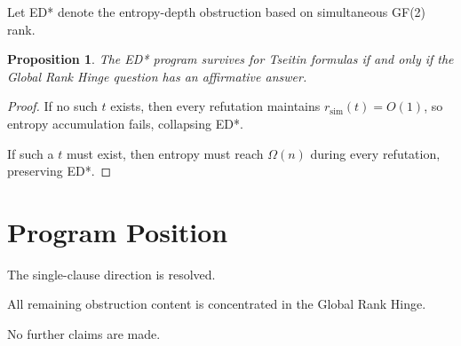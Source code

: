 \documentclass[11pt]{article}
\newtheorem{proposition}{Proposition}
\begin{document}
Let ED* denote the entropy-depth obstruction
based on simultaneous GF(2) rank.

\begin{proposition}
The ED* program survives for Tseitin formulas
if and only if the Global Rank Hinge question
has an affirmative answer.
\end{proposition}

\begin{proof}
If no such $t$ exists,
then every refutation maintains
$r_{\mathrm{sim}}(t)=O(1)$,
so entropy accumulation fails,
collapsing ED*.

If such a $t$ must exist,
then entropy must reach $\Omega(n)$
during every refutation,
preserving ED*.
\end{proof}

\section{Program Position}

The single-clause direction is resolved.

All remaining obstruction content
is concentrated in the Global Rank Hinge.

No further claims are made.
\end{document}
